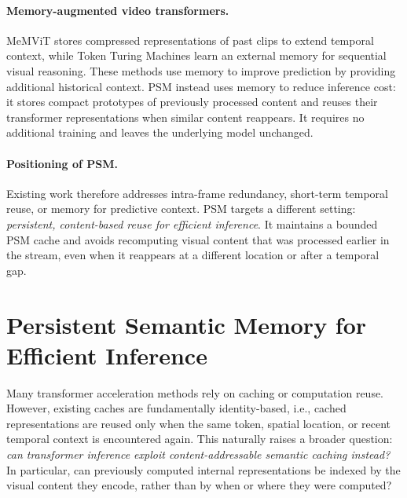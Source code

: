 \documentclass[letterpaper]{article}
\begin{document}
\paragraph{Memory-augmented video transformers.}
MeMViT \cite{memvit} stores compressed representations of past clips to
extend temporal context, while Token Turing Machines \cite{ttm} learn an
external memory for sequential visual reasoning. These methods use memory
to improve prediction by providing additional historical context.
PSM instead uses memory to reduce inference cost: it stores compact
prototypes of previously processed content and reuses their transformer
representations when similar content reappears. It requires no additional
training and leaves the underlying model unchanged.
 
\paragraph{Positioning of PSM.}
Existing work therefore addresses intra-frame redundancy, short-term
temporal reuse, or memory for predictive context. PSM targets a
different setting: \emph{persistent, content-based reuse for efficient
inference}. It maintains a bounded PSM cache and avoids recomputing
visual content that was processed earlier in the stream, even when it
reappears at a different location or after a temporal gap.
 

 
\section{Persistent Semantic Memory for Efficient Inference} 
\label{sec:method}
 
Many transformer acceleration methods rely on caching or computation reuse. However, existing caches are fundamentally identity-based, i.e., cached representations are reused only when the same token, spatial location, or recent temporal context is encountered again. This naturally raises a broader question:
\emph{can transformer inference exploit content-addressable semantic
caching instead?} In particular, can previously computed internal
representations be indexed by the visual content they encode, rather than
by when or where they were computed?
 
\end{document}
